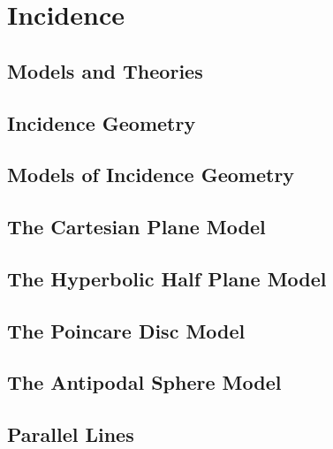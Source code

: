 \documentclass{memoir}
\begin{document}
\mainmatter

\chapter{Incidence}
\newpage

  \section{Models and Theories}
    
    \newpage

  \section{Incidence Geometry}
    
    \newpage

  \section{Models of Incidence Geometry}
    
    \newpage

  \section{The Cartesian Plane Model}
    
    \newpage

  \section{The Hyperbolic Half Plane Model}
    
    \newpage

  \section{The Poincare Disc Model}
    
    \newpage

  \section{The Antipodal Sphere Model}
    
    \newpage

  \section{Parallel Lines}
    
    \newpage
\end{document}
